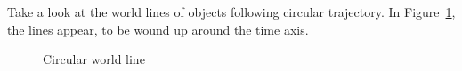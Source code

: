 \documentclass{egpubl}
\begin{document}
Take a look at the world lines of objects following circular trajectory. 
In Figure~\ref{fig:circularWL}, the lines appear, to be wound up around the time axis.

\begin{figure}[h]
\center
{}
\caption{Circular world line}
\label{fig:circularWL}
\end{figure}
\end{document}
